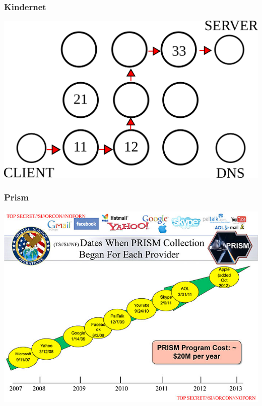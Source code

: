 \documentclass[12pt]{beamer}
\begin{document}
\begin{frame}
    \frametitle{Kindernet}
    \pause
    \includegraphics[height=0.7\textheight]{img/kindernet.png}
\end{frame}

\begin{frame}
    \frametitle{Prism}
    \pause
    \begin{center}
      \includegraphics[height=0.7\textheight]{img/prism.jpg}
    \end{center}
\end{frame}
\end{document}

